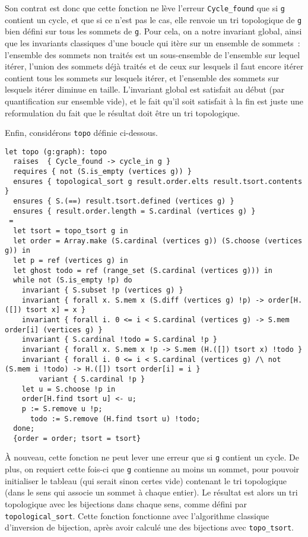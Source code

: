 \documentclass[a4paper,10pt]{article}
\begin{document}
Son contrat est donc que cette fonction ne lève l'erreur \lstinline{Cycle_found} que si \lstinline{g} contient un cycle, et que si ce n'est pas le cas, elle renvoie un tri topologique de \lstinline{g} bien défini sur tous les sommets de \lstinline{g}. Pour cela, on a notre invariant global, ainsi que les invariants classiques d'une boucle qui itère sur un ensemble de sommets~: l'ensemble des sommets non traités est un sous-ensemble de l'ensemble sur lequel itérer, l'union des sommets déjà traités et de ceux sur lesquels il faut encore itérer contient tous les sommets sur lesquels itérer, et l'ensemble des sommets sur lesquels itérer diminue en taille. L'invariant global est satisfait au début (par quantification sur ensemble vide), et le fait qu'il soit satisfait à la fin est juste une reformulation du fait que le résultat doit être un tri topologique.

Enfin, considérons \lstinline{topo} définie ci-dessous.

\begin{lstlisting}
let topo (g:graph): topo
  raises  { Cycle_found -> cycle_in g }
  requires { not (S.is_empty (vertices g)) }
  ensures { topological_sort g result.order.elts result.tsort.contents }
  ensures { S.(==) result.tsort.defined (vertices g) }
  ensures { result.order.length = S.cardinal (vertices g) }
 =
  let tsort = topo_tsort g in
  let order = Array.make (S.cardinal (vertices g)) (S.choose (vertices g)) in
  let p = ref (vertices g) in
  let ghost todo = ref (range_set (S.cardinal (vertices g))) in
  while not (S.is_empty !p) do
    invariant { S.subset !p (vertices g) }
    invariant { forall x. S.mem x (S.diff (vertices g) !p) -> order[H.([]) tsort x] = x }
    invariant { forall i. 0 <= i < S.cardinal (vertices g) -> S.mem order[i] (vertices g) }
    invariant { S.cardinal !todo = S.cardinal !p }
    invariant { forall x. S.mem x !p -> S.mem (H.([]) tsort x) !todo }
    invariant { forall i. 0 <= i < S.cardinal (vertices g) /\ not (S.mem i !todo) -> H.([]) tsort order[i] = i }
		variant { S.cardinal !p }
    let u = S.choose !p in
    order[H.find tsort u] <- u;
    p := S.remove u !p;
	  todo := S.remove (H.find tsort u) !todo;
  done;
  {order = order; tsort = tsort}
\end{lstlisting}

À nouveau, cette fonction ne peut lever une erreur que si \lstinline{g} contient un cycle. De plus, on requiert cette fois-ci que \lstinline{g} contienne au moins un sommet, pour pouvoir initialiser le tableau (qui serait sinon certes vide) contenant le tri topologique (dans le sens qui associe un sommet à chaque entier). Le résultat est alors un tri topologique avec les bijections dans chaque sens, comme défini par \lstinline{topological_sort}. Cette fonction fonctionne avec l'algorithme classique d'inversion de bijection, après avoir calculé une des bijections avec \lstinline{topo_tsort}.
\end{document}
